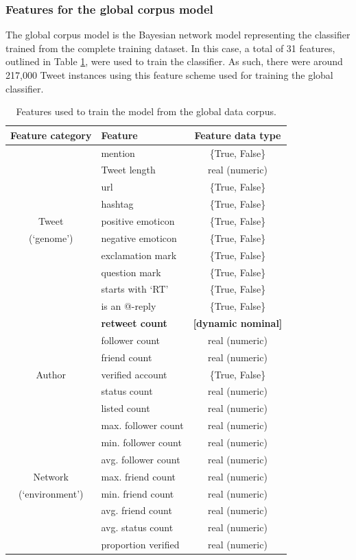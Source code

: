 \subsubsection{Features for the global corpus model}
The global corpus model is the Bayesian network model representing the classifier trained from the complete training dataset. In this case, a total of 31 features, outlined in Table \ref{table:globalfeatures}, were used to train the classifier. As such, there were around 217,000 Tweet instances using this feature scheme used for training the global classifier.

\begin{table}[h]\footnotesize
\begin{center}
\begin{tabular}{ c | l | c }
	 Feature category	& Feature & Feature data type \\
	 \hline
	 \hline 
	& mention & \{True, False\}\\
    & Tweet length & real (numeric)\\
    & url & \{True, False\}\\
  	& hashtag & \{True, False\}\\
  	Tweet & positive emoticon & \{True, False\}\\
  	(`genome')& negative emoticon & \{True, False\}\\
  	& exclamation mark & \{True, False\}\\
  	& question mark & \{True, False\}\\
  	& starts with `RT' & \{True, False\}\\
  	& is an @-reply & \{True, False\}\\
    & \textbf{retweet count} & \textbf{[dynamic nominal]}\\
  \hline                        
	& follower count & real (numeric)\\
    & friend count  & real (numeric)\\
	Author & verified account & \{True, False\}\\
	& status count & real (numeric)\\
	& listed count & real (numeric)\\
    \hline
  	&  max. follower count & real (numeric)\\
	&  min. follower count & real (numeric)\\
	& avg. follower count & real (numeric)\\
    Network & max. friend count & real (numeric)\\
	(`environment') & min. friend count & real (numeric)\\
	& avg. friend count & real (numeric)\\  
	& avg. status count & real (numeric)\\  
  	& proportion verified & real (numeric)\\  
  \hline  
\end{tabular}
\end{center}
\caption{Features used to train the model from the global data corpus.}
\label{table:globalfeatures}
\end{table}

